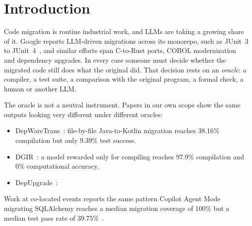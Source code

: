 \section{Introduction}
\label{sec:intro}

Code migration is routine industrial work, and LLMs are taking a growing share of it. Google reports LLM-driven migrations across its monorepo, such as JUnit~3 to JUnit~4~\cite{googlemig}, and similar efforts span C-to-Rust ports, COBOL modernization and dependency upgrades. In every case someone must decide whether the migrated code still does what the original did. That decision rests on an \emph{oracle}: a compiler, a test suite, a comparison with the original program, a formal check, a human or another LLM.

The oracle is not a neutral instrument. Papers in our own scope show the same outputs looking very different under different oracles:
\begin{itemize}
  \item DepWareTrans~\cite{depwaretrans}: file-by-file Java-to-Kotlin migration reaches 38.16\% compilation but only 9.39\% test success.
  \item DGIR~\cite{dgir}: a model rewarded only for compiling reaches 97.9\% compilation and 0\% computational accuracy.
  \item DepUpgrade~\cite{depupgrade}: 
\end{itemize}
Work at co-located events reports the same pattern\new{:} Copilot Agent Mode migrating SQLAlchemy reaches a median migration coverage of 100\% but a median test pass rate of 39.75\%~\cite{copilotmig}. 

